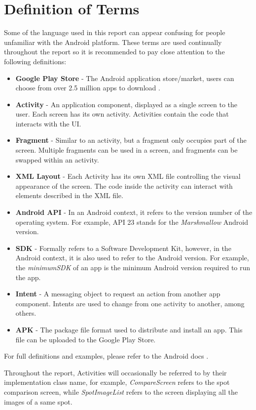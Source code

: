 \section{Definition of Terms}
Some of the language used in this report can appear confusing for people unfamiliar with the Android platform. These terms are used continually throughout the report so it is recommended to pay close attention to the following definitions:
\begin{itemize}
    \item \textbf{Google Play Store} - The Android application store/market, users can choose from over 2.5 million apps to download \cite{appbrain_2019}.
    \item \textbf{Activity} - An application component, displayed as a single screen to the user. Each screen has its own activity. Activities contain the code that interacts with the UI.
    \item \textbf{Fragment} - Similar to an activity, but a fragment only occupies part of the screen. Multiple fragments can be used in a screen, and fragments can be swapped within an activity.
    \item \textbf{XML Layout} - Each Activity has its own XML file controlling the visual appearance of the screen. The code inside the activity can interact with elements described in the XML file.
    \item \textbf{Android API} - In an Android context, it refers to the version number of the operating system. For example, API 23 stands for the \emph{Marshmallow} Android version.
    \item \textbf{SDK} - Formally refers to a Software Development Kit, however, in the Android context, it is also used to refer to the Android version. For example, the \emph{minimumSDK} of an app is the minimum Android version required to run the app.
    \item \textbf{Intent} - A messaging object to request an action from another app component. Intents are used to change from one activity to another, among others.
    \item \textbf{APK} - The package file format used to distribute and install an app. This file can be uploaded to the Google Play Store.
\end{itemize}
For full definitions and examples, please refer to the Android docs \cite{androidfullguide}.

Throughout the report, Activities will occasionally be referred to by their implementation class name, for example, \emph{CompareScreen} refers to the spot comparison screen, while \emph{SpotImageList} refers to the screen displaying all the images of a same spot.

